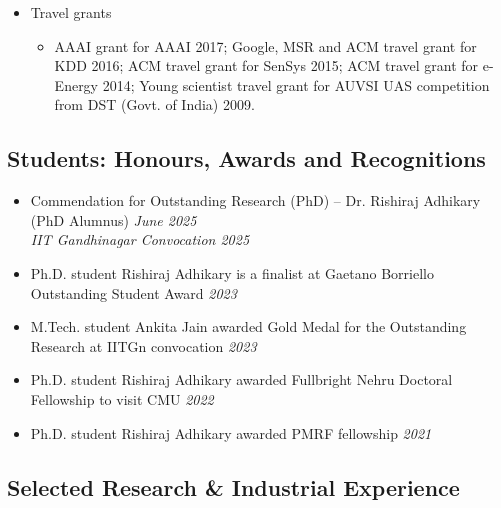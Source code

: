 \documentclass[letter,10pt]{article}
\begin{document}
\begin{itemize}
    \item[] Travel grants
    \begin{itemize}
        \item[] AAAI grant for AAAI 2017; Google, MSR and ACM travel grant for KDD 2016; ACM travel grant for SenSys 2015; ACM travel grant for e-Energy 2014; Young scientist travel grant for AUVSI UAS competition from DST (Govt. of India) 2009.
    \end{itemize}
   
    
\end{itemize}

\subsection*{\textbf{Students: Honours, Awards and Recognitions}}
\vspace{-0.4em}
\begin{itemize}
\item[]{Commendation for Outstanding Research (PhD) – Dr. Rishiraj Adhikary (PhD Alumnus)} \hfill\textit{June 2025}\\
    \textit{IIT Gandhinagar Convocation 2025}
\item[]{Ph.D. student Rishiraj Adhikary is a finalist at Gaetano Borriello Outstanding Student Award} \hfill\textit{2023}
\item[]{M.Tech. student Ankita Jain awarded Gold Medal for the Outstanding Research at IITGn convocation} \hfill\textit{2023}
\item[]{Ph.D. student Rishiraj Adhikary awarded Fullbright Nehru Doctoral Fellowship to visit CMU} \hfill\textit{2022}
\item[]{Ph.D. student Rishiraj Adhikary awarded PMRF fellowship} \hfill\textit{2021}
   
    
\end{itemize}


\subsection*{\textbf{Selected Research \& Industrial Experience}}
\vspace{-0.4em}
\end{document}
